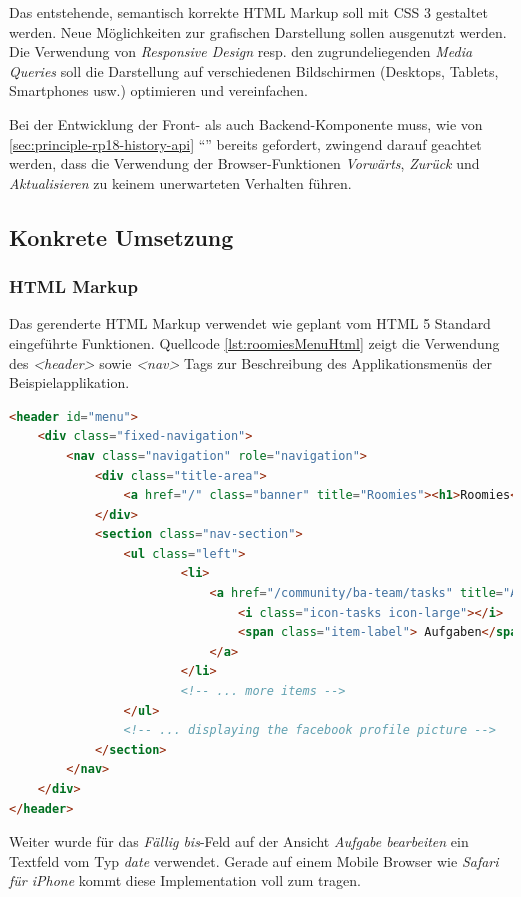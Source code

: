 Das entstehende, semantisch korrekte HTML Markup soll mit CSS 3 gestaltet werden. Neue Möglichkeiten zur grafischen Darstellung sollen ausgenutzt werden. Die Verwendung von \emph{Responsive Design} resp. den zugrundeliegenden \emph{Media Queries} \cite{css-mediaquery} soll die  Darstellung auf verschiedenen Bildschirmen (Desktops, Tablets, Smartphones usw.) optimieren und vereinfachen.

Bei der Entwicklung der Front- als auch Backend-Komponente muss, wie von \ref{sec:principle-rp18-history-api} ``'' bereits gefordert, zwingend darauf geachtet werden, dass die Verwendung der Browser-Funktionen \emph{Vorwärts}, \emph{Zurück} und \emph{Aktualisieren} zu keinem unerwarteten Verhalten führen.


\subsection*{Konkrete Umsetzung}

\subsubsection*{HTML Markup}

Das gerenderte HTML Markup verwendet wie geplant vom HTML 5 Standard eingeführte Funktionen. Quellcode \ref{lst:roomiesMenuHtml} zeigt die Verwendung des \emph{<header>} sowie \emph{<nav>} Tags zur Beschreibung des Applikationsmenüs der Beispielapplikation.

\begin{lstlisting}[language=HTML, caption={Ausschnitt des gerenderten HTML Markups der Menüleiste \emph{Roomies}}, label={lst:roomiesMenuHtml}]
<header id="menu">
	<div class="fixed-navigation">
		<nav class="navigation" role="navigation">
			<div class="title-area">
				<a href="/" class="banner" title="Roomies"><h1>Roomies</h1></a>
			</div>
			<section class="nav-section">
				<ul class="left">
						<li>
							<a href="/community/ba-team/tasks" title="Aufgaben">
								<i class="icon-tasks icon-large"></i>
								<span class="item-label"> Aufgaben</span>
							</a>
						</li>
						<!-- ... more items -->
				</ul>
				<!-- ... displaying the facebook profile picture -->
			</section>
		</nav>
	</div>
</header>
\end{lstlisting}

Weiter wurde für das \emph{Fällig bis}-Feld auf der Ansicht \emph{Aufgabe bearbeiten} ein Textfeld vom Typ \emph{date} verwendet. Gerade auf einem Mobile Browser wie \emph{Safari für iPhone} kommt diese Implementation voll zum tragen.


